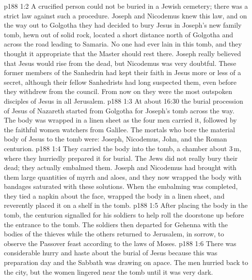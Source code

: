 \vs p188 1:2 A crucified person could not be buried in a Jewish cemetery; there was a strict law against such a procedure. Joseph and Nicodemus knew this law, and on the way out to Golgotha they had decided to bury Jesus in Joseph’s new family tomb, hewn out of solid rock, located a short distance north of Golgotha and across the road leading to Samaria. No one had ever lain in this tomb, and they thought it appropriate that the Master should rest there. Joseph really believed that Jesus would rise from the dead, but Nicodemus was very doubtful. These former members of the Sanhedrin had kept their faith in Jesus more or less of a secret, although their fellow Sanhedrists had long suspected them, even before they withdrew from the council. From now on they were the most outspoken disciples of Jesus in all Jerusalem.
\vs p188 1:3 At about 16:30 the burial procession of Jesus of Nazareth started from Golgotha for Joseph’s tomb across the way. The body was wrapped in a linen sheet as the four men carried it, followed by the faithful women watchers from Galilee. The mortals who bore the material body of Jesus to the tomb were: Joseph, Nicodemus, John, and the Roman centurion.
\vs p188 1:4 They carried the body into the tomb, a chamber about 3\,m, where they hurriedly prepared it for burial. The Jews did not really bury their dead; they actually embalmed them. Joseph and Nicodemus had brought with them large quantities of myrrh and aloes, and they now wrapped the body with bandages saturated with these solutions. When the embalming was completed, they tied a napkin about the face, wrapped the body in a linen sheet, and reverently placed it on a shelf in the tomb.
\vs p188 1:5 After placing the body in the tomb, the centurion signalled for his soldiers to help roll the doorstone up before the entrance to the tomb. The soldiers then departed for Gehenna with the bodies of the thieves while the others returned to Jerusalem, in sorrow, to observe the Passover feast according to the laws of Moses.
\vs p188 1:6 There was considerable hurry and haste about the burial of Jesus because this was preparation day and the Sabbath was drawing on apace. The men hurried back to the city, but the women lingered near the tomb until it was very dark.
